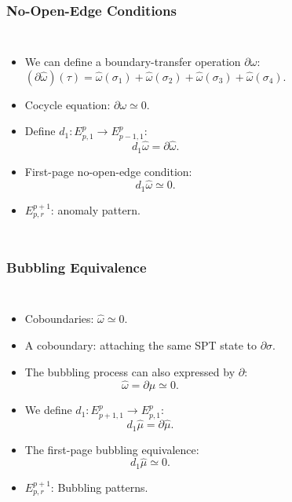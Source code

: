 \documentclass[xcolor=table, 11pt, aspectratio=169]{beamer}
\begin{document}
\begin{frame}
	\frametitle{No-Open-Edge Conditions}
	\begin{columns}
		\begin{itemize}
			\item We can define a boundary-transfer operation $\partial\omega$:
			\[(\partial\hat\omega)(\tau)=\hat\omega(\sigma_1)
			+\hat\omega(\sigma_2)+\hat\omega(\sigma_3)+\hat\omega(\sigma_4).\]
			\item Cocycle equation: $\partial\omega\simeq0.$
			\item Define $d_1: E^p_{p,1}\rightarrow E^p_{p-1,1}$:
			\[d_1\hat\omega = \partial\hat\omega.\]
			\item First-page no-open-edge condition:
			\[d_1\hat\omega \simeq 0.\]
			\item $E^{p+1}_{p,r}$: anomaly pattern.
		\end{itemize}
	\end{columns}
\end{frame}

\begin{frame}
	\frametitle{Bubbling Equivalence}
\begin{columns}
\begin{itemize}
\item Coboundaries: $\hat\omega\simeq0$.
\item A coboundary: attaching the same SPT state to  $\partial \sigma$.
\item The bubbling process can also expressed by $\partial$:
\[\hat\omega = \partial\hat\mu\simeq0.\]
\item We define $d_1:E^p_{p+1, 1}\rightarrow E^p_{p,1}$:
\[d_1\hat\mu = \partial\hat\mu.\]
\item The first-page bubbling equivalence:
\[d_1\hat\mu\simeq0.\]
\item $E^{p+1}_{p,r}$: Bubbling patterns.
\end{itemize}
\begin{animateinline}{5}
\end{animateinline}
\end{columns}
\end{frame}
\end{document}
